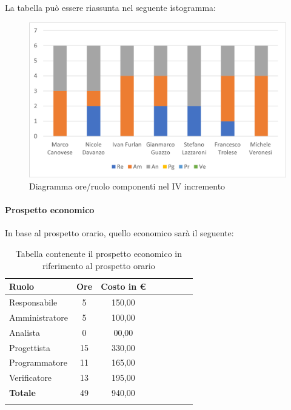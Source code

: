 La tabella può essere riassunta nel seguente istogramma:

\begin{figure}[H]
	\centering
	\includegraphics[width=0.8\linewidth]{res/images/preventivo/dettaglio_analisi/1-1.png}
	\caption{Diagramma ore/ruolo componenti nel IV incremento}
	\label{fig:diagramma suddivisione ruoli IV incremento}
\end{figure}

\paragraph{Prospetto economico}
In base al prospetto orario, quello economico sarà il seguente:

\begin{longtable}{|l|c|c|c|c|c|c|c|}
	\hline
	\rowcolor{lighter-grayer}
	\textbf{Ruolo}  & \textbf{Ore} & \textbf{Costo in €} \\
	\hline
	\endfirsthead

	\hline
	Responsabile    & 5            & 150,00              \\
	\hline
	\hline
	Amministratore  & 5           & 100,00              \\
	\hline
	\hline
	Analista        & 0           & 00,00              \\
	\hline
	\hline
	Progettista     & 15            & 330,00                   \\
	\hline
	\hline
	Programmatore   & 11            & 165,00                   \\
	\hline
	\hline
	Verificatore    & 13            & 195,00                   \\
	\hline
	\textbf{Totale} & 49           & 940,00            \\
	\hline
	\rowcolor{white}
	\caption{Tabella contenente il prospetto economico in riferimento al prospetto orario}
\end{longtable}
\pagebreak

